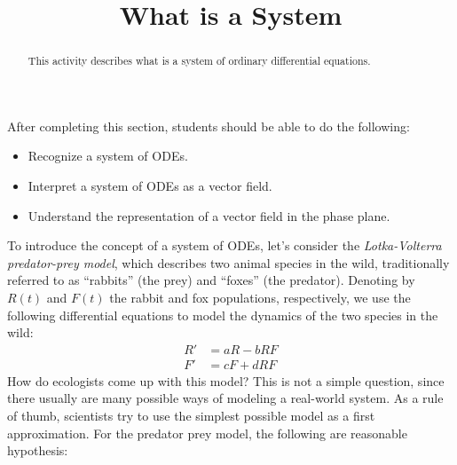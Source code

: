 \documentclass{ximera}
\title{What is a System}
\begin{document}
\begin{abstract}
This activity describes what is a system of ordinary differential equations.
\end{abstract}

\maketitle

\begin{sectionOutcomes}
After completing this section, students should be able to do the following:

\begin{itemize}
\item Recognize a system of ODEs.
\item Interpret a system of ODEs as a vector field.
\item Understand the representation of a vector field in the phase plane.
\end{itemize}

\end{sectionOutcomes}

To introduce the concept of a system of ODEs, let's consider the \emph{Lotka-Volterra predator-prey model}, which describes two animal species in the wild, traditionally referred to as ``rabbits'' (the prey) and ``foxes'' (the predator). Denoting by $R(t)$ and $F(t)$ the rabbit and fox populations, respectively, we use the following differential equations to model the dynamics of the two species in the wild:
\begin{align}
\label{rabbit-eq}R'&=aR-bRF\\
\label{fox-eq}F'&=cF+dRF
\end{align}
How do ecologists come up with this model? This is not a simple question, since there usually are many possible ways of modeling a real-world system. As a rule of thumb, scientists try to use the simplest possible model as a first approximation. For the predator prey model, the following are reasonable hypothesis:
\end{document}
